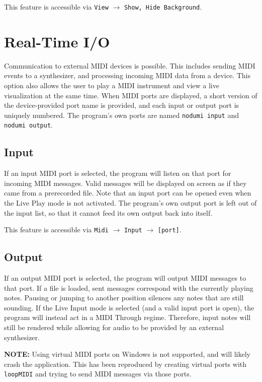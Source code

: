 \documentclass[english]{article}
\providecommand{\mi}[1]{\texttt{#1}}
\begin{document}
This feature is accessible via 
\mi{View} $\rightarrow$ \mi{{Show, Hide} Background}.

\section{Real-Time I/O}

Communication to external MIDI devices is possible. This includes sending MIDI events to a synthesizer,
and processing incoming MIDI data from a device. This option also allows the user to play a MIDI instrument and
view a live visualization at the same time. When MIDI ports are displayed, a short version of the device-provided
port name is provided, and each input or output port is uniquely numbered. The program's own ports are named
\mi{nodumi input} and \mi{nodumi output}.

\subsection{Input}

If an input MIDI port is selected, the program will listen on that port for incoming MIDI messages. Valid messages will
be displayed on screen as if they came from a prerecorded file. Note that an input port can be opened even when the
Live Play mode is not activated. The program's own output port is left out of the input list, so that it cannot feed its
own output back into itself.

This feature is accessible via 
\mi{Midi} $\rightarrow$ \mi{Input} $\rightarrow$ \mi{[port]}.

\subsection{Output}
\label{subsec:output}

If an output MIDI port is selected, the program will output MIDI messages to that port. If a file is loaded, sent messages
correspond with the currently playing notes. Pausing or jumping to another position silences any notes that are still sounding. If the Live Input mode is selected (and a valid input port is open), the program
will instead act in a MIDI Through regime. Therefore, input notes will still 
be rendered while allowing for audio to be provided by an external synthesizer.

\textbf{NOTE:} Using virtual MIDI ports on Windows is not supported, and will likely crash the application. This has been
reproduced by creating virtual ports with \mi{loopMIDI} and trying to send MIDI messages via those ports.
\end{document}
